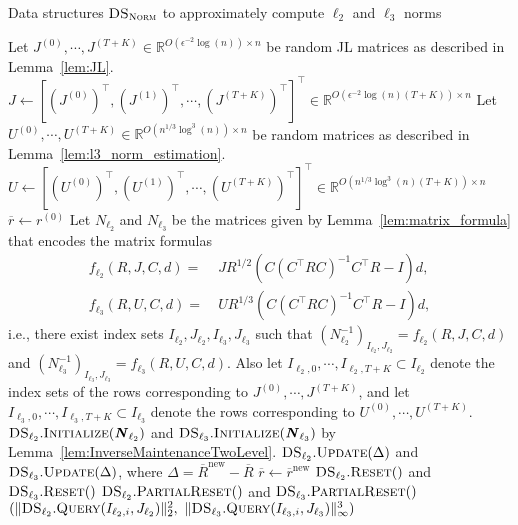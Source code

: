 \documentclass[11pt]{article}
\newcommand{\new}{\mathrm{new}}
\newcommand\dd{\boldsymbol{\mathit{d}}}
\newcommand\rr{\boldsymbol{\mathit{r}}}
\newcommand\CC{\boldsymbol{\mathit{C}}}
\newcommand\II{\boldsymbol{\mathit{I}}}
\newcommand\JJ{\boldsymbol{\mathit{J}}}
\newcommand\NN{\boldsymbol{\mathit{N}}}
\newcommand\RR{\boldsymbol{\mathit{R}}}
\newcommand\UU{\boldsymbol{\mathit{U}}}
\newcommand{\ov}{\overline}
\newcommand\R{\mathbb{R}}
\begin{document}
\begin{algorithm}
\caption{Data structures $\textsc{DS}_{\textsc{Norm}}$ to approximately compute $\ell_2$ and $\ell_3$ norms}\label{alg:DS_Norm}
\begin{algorithmic}[1]
\State Let $\JJ^{(0)}, \cdots, \JJ^{(T+K)} \in \R^{O(\epsilon^{-2} \log(n)) \times n}$ be random JL matrices as described in Lemma~\ref{lem:JL}.
\State $\JJ \gets [(\JJ^{(0)})^{\top}, (\JJ^{(1)})^{\top}, \cdots, (\JJ^{(T+K)})^{\top}]^{\top} \in \R^{O(\epsilon^{-2} \log(n) (T+K)) \times n}$
\State Let $\UU^{(0)}, \cdots, \UU^{(T+K)} \in \R^{O(n^{1/3} \log^3(n)) \times n}$ be random matrices as described in Lemma~\ref{lem:l3_norm_estimation}.
\State $\UU \gets [(\UU^{(0)})^{\top}, (\UU^{(1)})^{\top}, \cdots, (\UU^{(T+K)})^{\top}]^{\top} \in \R^{O(n^{1/3} \log^3(n) (T+K)) \times n}$
\State $\ov{\rr} \leftarrow \rr^{(0)}$
\State Let $\NN_{\ell_2}$ and $\NN_{\ell_3}$ be the matrices given by Lemma~\ref{lem:matrix_formula} that encodes the matrix formulas
\begin{align*}
f_{\ell_2}(\RR, \JJ, \CC, \dd) = &~ \JJ \RR^{1/2} (\CC (\CC^{\top} \RR \CC)^{-1} \CC^{\top} \RR - \II) \dd, \\
f_{\ell_3}(\RR, \UU, \CC, \dd) = &~ \UU \RR^{1/3} (\CC (\CC^{\top} \RR \CC)^{-1} \CC^{\top} \RR - \II) \dd,
\end{align*}
i.e., there exist index sets $I_{\ell_2},J_{\ell_2},I_{\ell_3},J_{\ell_3}$ such that $(\NN_{\ell_2}^{-1})_{I_{\ell_2},J_{\ell_2}} = f_{\ell_2}(\RR, \JJ, \CC, \dd)$ and $(\NN_{\ell_3}^{-1})_{I_{\ell_3},J_{\ell_3}} = f_{\ell_3}(\RR, \UU, \CC, \dd)$. Also let $I_{\ell_2,0}, \cdots, I_{\ell_2,T+K} \subset I_{\ell_2}$ denote the index sets of the rows corresponding to $\JJ^{(0)}, \cdots, \JJ^{(T+K)}$, and let $I_{\ell_3,0}, \cdots, I_{\ell_3,T+K} \subset I_{\ell_3}$ denote the rows corresponding to $\UU^{(0)}, \cdots, \UU^{(T+K)}$.
\State $\textsc{DS}_{\ell_2}.\textsc{Initialize}(\NN_{\ell_2})$ and $\textsc{DS}_{\ell_3}.\textsc{Initialize}(\NN_{\ell_3})$ by Lemma~\ref{lem:InverseMaintenanceTwoLevel}.
\EndProcedure
\Procedure{UpdateQuery}{$\ov{\rr}^{\new}$, $i$}
\State $\textsc{DS}_{\ell_2}.\textsc{Update}(\Delta)$ and $\textsc{DS}_{\ell_3}.\textsc{Update}(\Delta)$, where $\Delta = \ov{\RR}^{\new} - \ov{\RR}$
\State $\ov{\rr} \gets \ov{\rr}^{\new}$
\State $\textsc{DS}_{\ell_2}.\textsc{Reset}()$ and $\textsc{DS}_{\ell_3}.\textsc{Reset}()$
\State $\textsc{DS}_{\ell_2}.\textsc{PartialReset}()$ and $\textsc{DS}_{\ell_3}.\textsc{PartialReset}()$
\EndIf
\State \Return $(\|\textsc{DS}_{\ell_2}.\textsc{Query}(I_{\ell_2,i}, J_{\ell_2})\|_2^2, ~\|\textsc{DS}_{\ell_3}.\textsc{Query}(I_{\ell_3,i}, J_{\ell_3})\|_{\infty}^3)$ \label{algline:DS_norm_return}
\EndProcedure
\end{algorithmic}
\end{algorithm}
\end{document}
